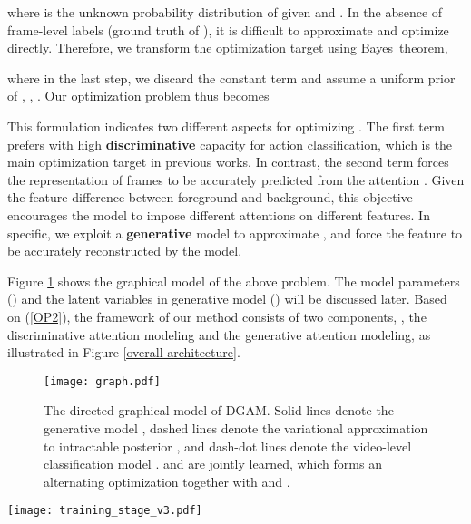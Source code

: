 \documentclass[10pt,twocolumn,letterpaper]{article}
\begin{document}
where  is the unknown probability distribution of  given  and .
In the absence of frame-level labels (ground truth of ), it is difficult to approximate and optimize  directly.
Therefore, we transform the optimization target using Bayes\textquotesingle~theorem,

where in the last step, we discard the constant term  and assume a uniform prior of , \ie, . Our optimization problem thus becomes

This formulation indicates two different aspects for optimizing .
The first term  prefers  with high \textbf{discriminative} capacity for action classification, which is the main optimization target in previous works.
In contrast, the second term  forces the representation of frames to be accurately predicted from the attention .
Given the feature difference between foreground and background, this objective encourages the model to impose different attentions on different features.
In specific, we exploit a \textbf{generative} model to approximate , and force the feature  to be accurately reconstructed by the model.

Figure \ref{graphicModel} shows the graphical model of the above problem. The model parameters () and the latent variables in generative model () will be discussed later.
Based on (\ref{OP2}), the framework of our method consists of two components, \ie, the discriminative attention modeling and the generative attention modeling, as illustrated in Figure \ref{overall architecture}.

\begin{figure}[t]
  \centering
  \texttt{[image: graph.pdf]}
  \caption{The directed graphical model of DGAM. Solid lines denote the generative model , dashed lines denote the variational approximation  to intractable posterior , and dash-dot lines denote the video-level classification model .  and  are jointly learned, which forms an alternating optimization together with  and . }
\label{graphicModel}
\end{figure}


\begin{figure*}[htbp]
  \centering
  \texttt{[image: training\_stage\_v3.pdf]}
  \caption{\textbf{Framework overview.} The proposed model is trained in two alternating stages (a) and (b).
  In stage (a), the generative model (CVAE) is frozen. Attention module and classification module are updated with classification-based discriminative loss , representation-based reconstruction loss  and regularization loss . In stage (b), attention and classification modules are frozen. The CVAE is trained with loss  to reconstruct the representation of frames with different . Since the ground truth  is unavailable, we utilize  predicted by attention module as ``pseudo label'' for training. }
\label{overall architecture}
\end{figure*}
\end{document}
